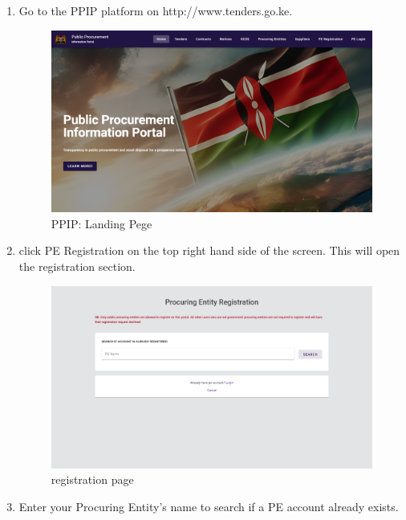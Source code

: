 \documentclass [12pt]{book}
\begin{document}
\begin{enumerate}
    \begin{enumerate}    
        \item Go to the PPIP platform on http://www.tenders.go.ke.
       \begin{figure}[h]
        \includegraphics[scale = 0.25 ]{public_images/landing_page.png}
        \centering
        \caption{PPIP: Landing Pege}
    \end{figure}
    
        \item click PE Registration on the top right hand side of the screen.
        This will open the registration section.
        
        \begin{figure}
            \includegraphics[scale=0.25]{public_images/registration_page.png}
            \caption{registration page}
            \centering
        \end{figure}
        
        \item Enter your Procuring Entity's name to search if a PE account already exists.
        

\end{enumerate}
\end{enumerate}
\end{document}
